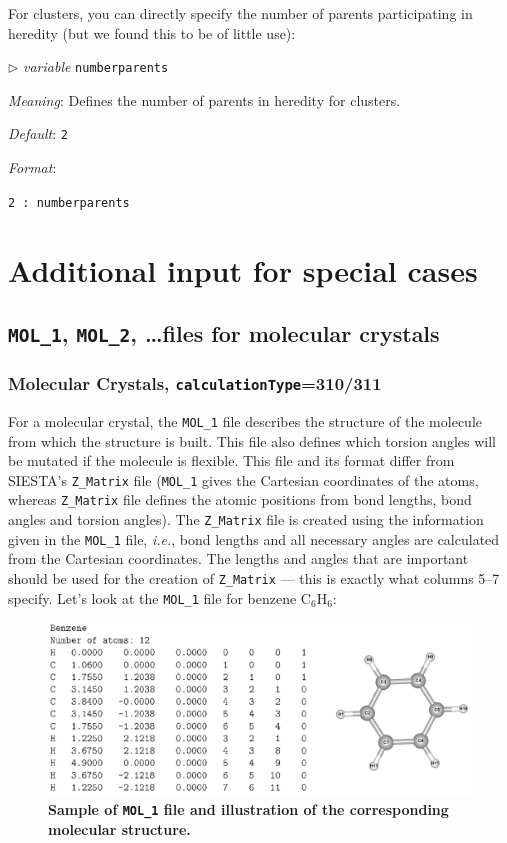\documentclass[12pt]{article}
\newcommand{\keyword}[1]{\texttt{#1}}
\newcommand{\file}[1]{\texttt{#1}}
\newcommand{\paramacro}[6]{
\vspace{0.5cm}
$\triangleright$ \emph{variable} {\color{blue} \texttt{#1}}

\emph{Meaning}: {#2}

{#3}

\emph{Default}: \texttt{#4}

\emph{Format}:

{\addtolength{\leftskip}{10mm} 
\texttt{#5}
\par}


{\small #6}

}
\begin{document}
\vspace{0.5cm}

For clusters, you can directly specify the number of parents participating in
heredity (but we found this to be of little use):

\paramacro{numberparents}{Defines the number of parents in heredity for
clusters.}{}{2}{2 : numberparents}{}



\newpage
\section{Additional input for special cases}

\subsection{\file{MOL\_1}, \file{MOL\_2}, \ldots files for molecular crystals}
\label{molecular_crystals}
 
\subsubsection{Molecular Crystals, \keyword{calculationType}=310/311} 

For a molecular crystal, the \file{MOL\_1} file describes the structure of the
molecule from which the structure is built. This file also defines which torsion
angles will be mutated if the molecule is flexible. This file and its format
differ from SIESTA's \file{Z\_Matrix} file (\file{MOL\_1} gives the Cartesian
coordinates of the atoms, whereas \file{Z\_Matrix} file defines the atomic
positions from bond lengths, bond angles and torsion angles). The
\file{Z\_Matrix} file is created using the information given in the
\file{MOL\_1} file, \emph{i.e.}, bond lengths and all necessary angles are
calculated from the Cartesian coordinates. The lengths and angles that are
important should be used for the creation of \file{Z\_Matrix} --- this is
exactly what columns 5--7 specify. Let's look at the \file{MOL\_1} file for
benzene C$_6$H$_6$:

\begin{figure}[htbp] \centering
\includegraphics[scale=0.36]{pic/benzene}
\caption{\footnotesize \textbf{Sample of \file{MOL\_1} file and illustration of
the corresponding molecular structure.}}
\label{fig:benzene}
\end{figure}
\end{document}
